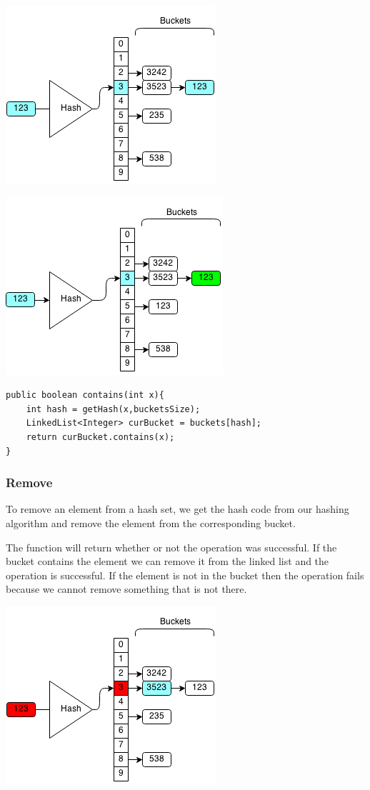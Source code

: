 \documentclass[11pt,oneside]{book}
\makeatletter
\def\maxwidth#1{\ifdim\Gin@nat@width>#1 #1\else\Gin@nat@width\fi}
\makeatother
\begin{document}
\includegraphics[width=\maxwidth{\textwidth}]{hashsetcontains2.png}

\includegraphics[width=\maxwidth{\textwidth}]{hashsetcontains3.png}

\begin{lstlisting}
public boolean contains(int x){
    int hash = getHash(x,bucketsSize);
    LinkedList<Integer> curBucket = buckets[hash];
    return curBucket.contains(x);
}
\end{lstlisting}

\subsubsection{Remove}

To remove an element from a hash set, we get the hash code from our hashing algorithm and remove the element from the corresponding bucket.

The function will return whether or not the operation was successful. If the bucket contains the element we can remove it from the linked list and the operation is successful. If the element is not in the bucket then the operation fails because we cannot remove something that is not there.

\includegraphics[width=\maxwidth{\textwidth}]{hashsetrem.png}
\end{document}
